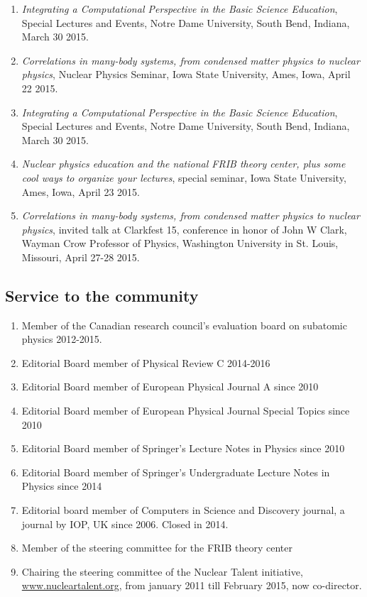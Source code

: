 \documentclass[prc,amsart,english,twocolumn,superscriptaddress,showpacs,floatfix]{revtex4}
\begin{document}
\begin{enumerate}
\item {\em Integrating a Computational Perspective in the Basic Science Education}, Special Lectures and Events, Notre Dame University, South Bend, Indiana, March 30 2015.

\item {\em Correlations in many-body systems, from condensed matter physics to nuclear physics}, Nuclear Physics Seminar, Iowa State University, Ames, Iowa, April 22 2015.
\item {\em ​Integrating a Computational Perspective in the Basic Science Education}, Special Lectures and Events, Notre Dame University, South Bend, Indiana, March 30 2015.

\item {\em Nuclear physics education and the national FRIB theory center, plus some cool ways to organize your lectures}, special seminar, Iowa State University, Ames, Iowa, April 23 2015.

\item {\em Correlations in many-body systems, from condensed matter physics to nuclear physics}, invited talk at Clarkfest 15,  conference in honor of John W Clark, Wayman Crow Professor of Physics, Washington University in St. Louis, Missouri, April 27-28 2015.
\end{enumerate}


 \subsection*{Service to the community}

\begin{enumerate}
\item Member of the Canadian research council's evaluation board on subatomic physics 2012-2015.
\item Editorial Board member of Physical Review C 2014-2016
\item Editorial Board member of European Physical Journal A since 2010
\item Editorial Board member of European Physical Journal Special Topics since 2010
\item Editorial Board member of Springer's Lecture Notes in Physics since 2010
\item Editorial Board member of Springer's Undergraduate Lecture Notes in Physics since 2014
\item Editorial board member of Computers in Science and Discovery journal, a journal by IOP, UK since 2006. Closed in 2014.
\item Member of the steering committee for the FRIB theory center
\item Chairing the steering committee of the Nuclear Talent initiative, \url{www.nucleartalent.org}, from january 2011 till February 2015, now co-director.  
\end{enumerate}
\end{document}
